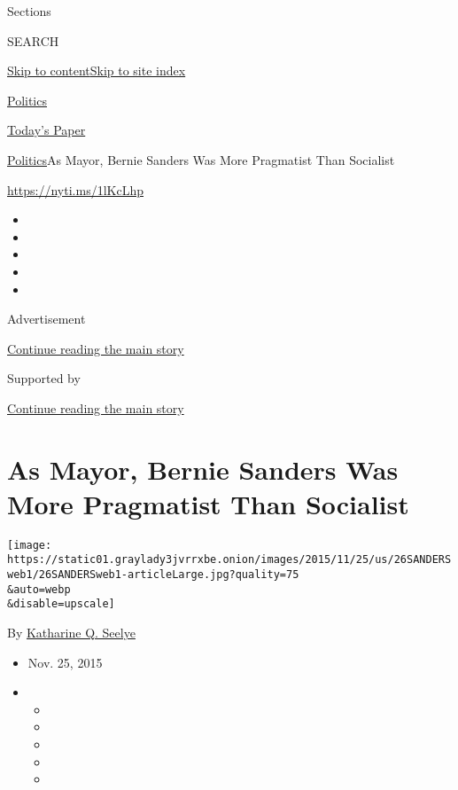 Sections

SEARCH

\protect\hyperlink{site-content}{Skip to
content}\protect\hyperlink{site-index}{Skip to site index}

\href{https://www.nytimes3xbfgragh.onion/section/politics}{Politics}

\href{https://myaccount.nytimes3xbfgragh.onion/auth/login?response_type=cookie\&client_id=vi}{}

\href{https://www.nytimes3xbfgragh.onion/section/todayspaper}{Today's
Paper}

\href{/section/politics}{Politics}\textbar{}As Mayor, Bernie Sanders Was
More Pragmatist Than Socialist

\url{https://nyti.ms/1lKcLhp}

\begin{itemize}
\item
\item
\item
\item
\item
\end{itemize}

Advertisement

\protect\hyperlink{after-top}{Continue reading the main story}

Supported by

\protect\hyperlink{after-sponsor}{Continue reading the main story}

\hypertarget{as-mayor-bernie-sanders-was-more-pragmatist-than-socialist}{%
\section{As Mayor, Bernie Sanders Was More Pragmatist Than
Socialist}\label{as-mayor-bernie-sanders-was-more-pragmatist-than-socialist}}

\texttt{[image: https://static01.graylady3jvrrxbe.onion/images/2015/11/25/us/26SANDERSweb1/26SANDERSweb1-articleLarge.jpg?quality=75\\\&auto=webp\\\&disable=upscale]}

By
\href{http://www.nytimes3xbfgragh.onion/by/katharine-q-seelye}{Katharine
Q. Seelye}

\begin{itemize}
\item
  Nov. 25, 2015
\item
  \begin{itemize}
  \item
  \item
  \item
  \item
  \item
  \end{itemize}
\end{itemize}

